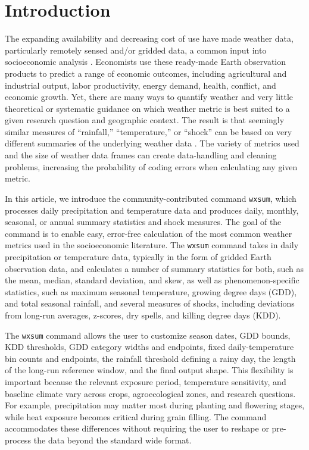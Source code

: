 \section{Introduction}

The expanding availability and decreasing cost of use have made weather data, particularly remotely sensed and/or gridded data, a common input into socioeconomic analysis \citep{Dell2014-rf, DonaldsonStoreygard16}. Economists use these ready-made Earth observation products to predict a range of economic outcomes, including agricultural and industrial output, labor productivity, energy demand, health, conflict, and economic growth. Yet, there are many ways to quantify weather and very little theoretical or systematic guidance on which weather metric is best suited to a given research question and geographic context. The result is that seemingly similar measures of ``rainfall,'' ``temperature,'' or ``shock'' can be based on very different summaries of the underlying weather data \citep{MichlerEtAl21WB}. The variety of metrics used and the size of weather data frames can create data-handling and cleaning problems, increasing the probability of coding errors when calculating any given metric.

In this article, we introduce the community-contributed command \texttt{wxsum}, which processes daily precipitation and temperature data and produces daily, monthly, seasonal, or annual summary statistics and shock measures. The goal of the command is to enable easy, error-free calculation of the most common weather metrics used in the socioeconomic literature. The \texttt{wxsum} command takes in daily precipitation or temperature data, typically in the form of gridded Earth observation data, and calculates a number of summary statistics for both, such as the mean, median, standard deviation, and skew, as well as phenomenon-specific statistics, such as maximum seasonal temperature, growing degree days (GDD), and total seasonal rainfall, and several measures of shocks, including deviations from long-run averages, z-scores, dry spells, and killing degree days (KDD).

The \texttt{wxsum} command allows the user to customize season dates, GDD bounds, KDD thresholds, GDD category widths and endpoints, fixed daily-temperature bin counts and endpoints, the rainfall threshold defining a rainy day, the length of the long-run reference window, and the final output shape. This flexibility is important because the relevant exposure period, temperature sensitivity, and baseline climate vary across crops, agroecological zones, and research questions. For example, precipitation may matter most during planting and flowering stages, while heat exposure becomes critical during grain filling. The command accommodates these differences without requiring the user to reshape or pre-process the data beyond the standard wide format.

